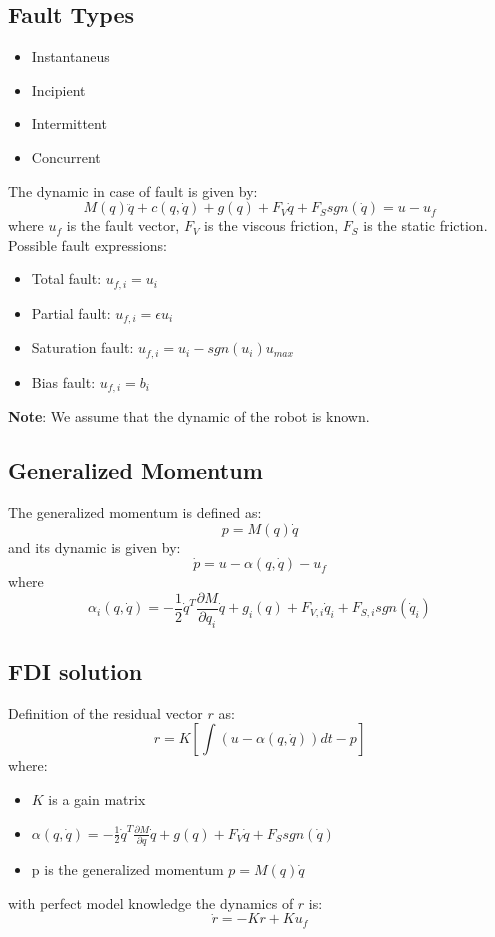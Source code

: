 \documentclass[a4paper,12pt]{article}
\begin{document}
\subsection{Fault Types}
\begin{itemize}
    \item Instantaneus 
    \item Incipient
    \item Intermittent
    \item Concurrent 
\end{itemize}
The dynamic in case of fault is given by:
\begin{equation}
M(q)\ddot{q}+c(q,\dot{q})+g(q)+F_{V}\dot{q}+F_{S}sgn(\dot{q})=u - u_f
\end{equation}
where $u_f$ is the fault vector, $F_{V}$ is the viscous friction,
$F_{S}$ is the static friction.\\
Possible fault expressions:
\begin{itemize}
    \item Total fault: $u_{f,i}=u_{i}$
    \item Partial fault: $u_{f,i}=\epsilon u_{i}$
    \item Saturation fault: $u_{f,i}=u_{i}-sgn(u_{i})u_{max}$
    \item Bias fault: $u_{f,i}=b_i$
\end{itemize}
\textbf{Note}: We assume that the dynamic of the robot is known.
\subsection{Generalized Momentum}
The generalized momentum is defined as:
\begin{equation}
p=M(q)\dot{q}
\end{equation}
and its dynamic is given by:
\begin{equation}
\dot{p}=u - \alpha(q,\dot{q}) - u_f
\end{equation}
where \begin{equation}\label{eq:alpha}
\alpha_i(q,\dot{q})=-\frac{1}{2}\dot{q}^T\frac{\partial M}{\partial q_i}\dot{q}+g_i(q)+F_{V,i}\dot{q}_i+F_{S,i}sgn(\dot{q}_i)
\end{equation}

\subsection{FDI solution}
Definition of the residual vector $r$ as:
\begin{equation}
r=K[\int(u-\alpha(q,\dot{q}))dt-p]
\end{equation}
where:
\begin{itemize}
    \item $K$ is a gain matrix
    \item $\alpha(q,\dot{q})=-\frac{1}{2}\dot{q}^T\frac{\partial M}{\partial q}\dot{q}+g(q)+F_{V}\dot{q}+F_{S}sgn(\dot{q})$
    \item p is the generalized momentum $p = M(q)\dot{q}$
\end{itemize}
with perfect model knowledge the dynamics of $r$ is: \begin{equation}
\dot{r}=-Kr + Ku_f
\end{equation}
\end{document}
